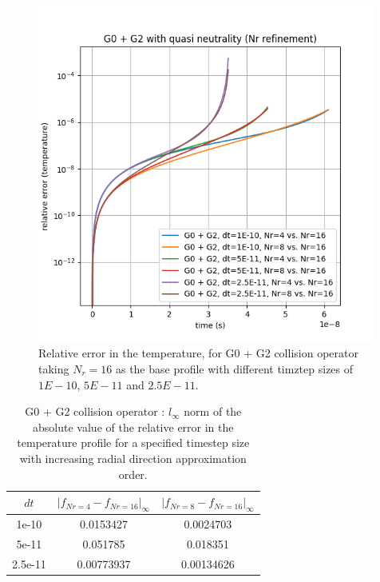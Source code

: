 \documentclass{article}
\begin{document}
\begin{figure}[H]
    \centering
    \includegraphics[width=0.99\textwidth]{dat/g02_nr.png}
    \caption{Relative error in the temperature, for G0 + G2 collision operator taking $N_r=16$ as the base profile with different timztep sizes of $1E-10$, $5E-11$ and $2.5E-11$.}
\end{figure}

\begin{table}[H]
    \centering
    \begin{tabular}{|c|c|c|}
        \hline
        $dt$ & $|f_{Nr=4}-f_{Nr=16}|_\infty$ & $|f_{Nr=8}-f_{Nr=16}|_\infty$ \\
        \hline
        1e-10         & 0.0153427        & 0.0024703   \\
        5e-11         & 0.051785         & 0.018351 \\
        2.5e-11       & 0.00773937       & 0.00134626 \\
        \hline
    \end{tabular}
    \caption{G0 + G2 collision operator : $l_\infty$ norm of the absolute value of the relative error in the temperature profile for a specified timestep size with increasing radial direction approximation order. }
\end{table}
\end{document}
